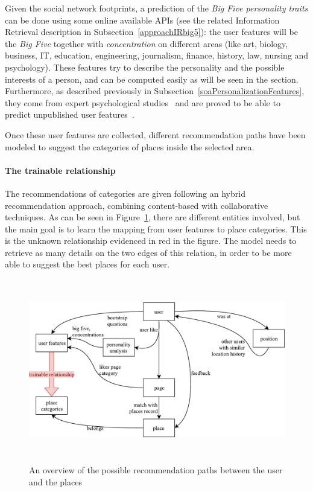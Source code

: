 Given the social network footprints, a prediction of the \textit{Big Five personality traits} can be done using some online available APIs (see the related Information Retrieval description in Subsection~\ref{approachIRbig5}): the user features will be the \textit{Big Five} together with \textit{concentration} on different areas (like art, biology, business, IT, education, engineering, journalism, finance, history, law, nursing and psychology). These features try to describe the personality and the possible interests of a person, and can be computed easily as will be seen in the section. Furthermore, as described previously in Subsection~\ref{soaPersonalizationFeatures}, they come from expert psychological studies~\cite{costa2008revised} and are proved to be able to predict unpublished user features~\cite{kosinski2013private}.

Once these user features are collected, different recommendation paths have been modeled to suggest the categories of places inside the selected area.

\paragraph{The trainable relationship}
The recommendations of categories are given following an hybrid recommendation approach, combining content-based with collaborative techniques. As can be seen in Figure~\ref{fig:recommendationPaths}, there are different entities involved, but the main goal is to learn the mapping from user features to place categories. This is the unknown relationship evidenced in red in the figure. The model needs to retrieve as many details on the two edges of this relation, in order to be more able to suggest the best places for each user.

\begin{figure}[!htb]
    \centering
    \includegraphics[max width=0.9\linewidth,max height=8cm,keepaspectratio]{figures/recommendationPaths}
    \caption{An overview of the possible recommendation paths between the user and the places}\label{fig:recommendationPaths}
\end{figure}

